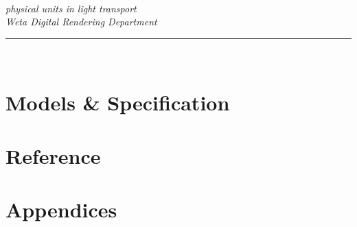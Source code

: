 \begin{titlepage}
\begin{center}

{\fontsize{60}{72}\selectfont \physLight}\\[.3cm]

\textsf{\textit{\fontsize{24}{26.8}\selectfont physical units in light transport}}\\[1.5cm]

\vfill
\large
\textit{Weta Digital Rendering Department}\\[1mm]

%

\hrule \vspace{1mm}
\textsc{\large \physLightVersion}\\[0.5cm]

\end{center}
\end{titlepage}

\tableofcontents
\listoffigures
\listoftables


\part{Models \& Specification}\label{part:models}






\part{Reference}\label{part:ref}




\part{Appendices}\label{part:app}
\appendix








\PrintGlossaries


